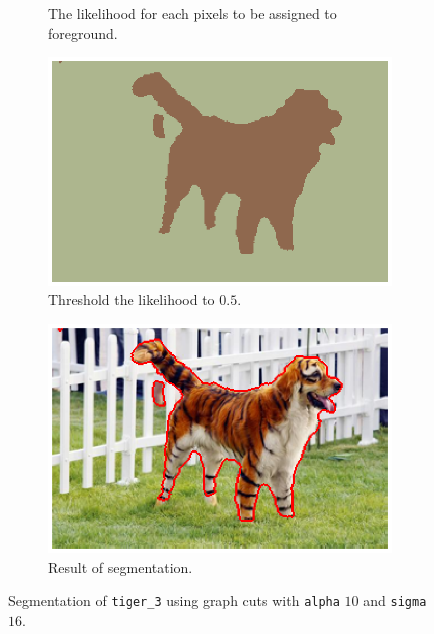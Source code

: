 \documentclass[11pt,a4paper]{article}
\begin{document}
\begin{itemize}
\begin{figure}[!ht]
\begin{subfigure}[t]{0.49\linewidth}
			\caption{The likelihood for each pixels to be assigned to foreground.}
			\label{fig:Graphcuts1_Tiger3_Alpha_10_Sigma_16_K_16}
			\end{subfigure}
			\begin{subfigure}[t]{0.49\linewidth} %
			\includegraphics[width=\columnwidth]{Graphcuts2_Tiger3_Alpha_10_Sigma_16_K_16.eps}
			\caption{Threshold the likelihood to $0.5$.}
			\label{fig:Graphcuts2_Tiger3_Alpha_10_Sigma_16_K_16}
			\end{subfigure}
			\begin{subfigure}[t]{0.49\linewidth} %
			\includegraphics[width=\columnwidth]{Graphcuts3_Tiger3_Alpha_10_Sigma_16_K_16.eps}
			\caption{Result of segmentation.}
			\label{fig:Graphcuts3_Tiger3_Alpha_10_Sigma_16_K_16}
			\end{subfigure}
			
			\caption{Segmentation of \texttt{tiger\_3} using graph cuts with \texttt{alpha} $10$ and \texttt{sigma} $16$.}
			\label{fig:Graphcuts_Tiger3_Alpha_10_Sigma_16_K_16}
		\end{figure}
	

\end{itemize}
\end{document}
